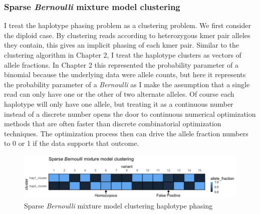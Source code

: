 \subsubsection{Sparse \textit{Bernoulli} mixture model clustering}

\par{
I treat the haplotype phasing problem as a clustering problem. We first consider the diploid case. By clustering reads according to heterozygous kmer pair alleles they contain, this gives an implicit phasing of each kmer pair. Similar to the clustering algorithm in Chapter 2, I treat the haplotype clusters as vectors of allele fractions. In Chapter 2 this represented the probability parameter of a binomial because the underlying data were allele counts, but here it represents the probability parameter of a \textit{Bernoulli} as I make the assumption that a single read can only have one or the other of two alternate alleles. Of course each haplotype will only have one allele, but treating it as a continuous number instead of a discrete number opens the door to continuous numerical optimization methods that are often faster than discrete combinatorial optimization techniques. The optimization process then can drive the allele fraction numbers to 0 or 1 if the data supports that outcome. \\
} 

\begin{figure}[htbp!]
\caption{Sparse \textit{Bernoulli} mixture model clustering haplotype phasing}
\label{figure:scaff}
\begin{centering}
\includegraphics[width=\textwidth]{sparsebernoulli.png}
\end{centering}

\end{figure}

